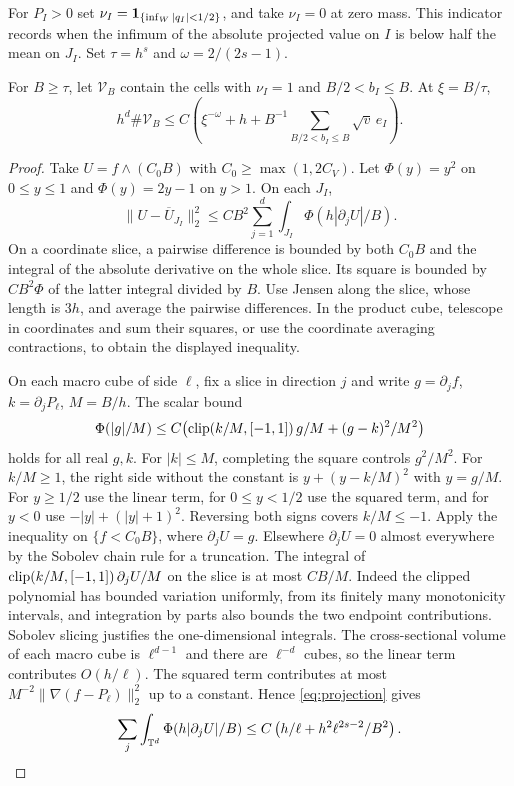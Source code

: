 For \(P_I>0\) set \(\nu_I=\mathbf 1_{\{\inf_W|q_I|<1/2\}}\),
and take \(\nu_I=0\) at zero mass.
This indicator records when the infimum of the absolute projected value
on \(I\) is below half the mean on \(J_I\).
Set \(\tau=h^s\) and \(\omega=2/(2s-1)\).
\begin{lemma}\label{lem:bands}
For \(B\ge\tau\), let \(\mathcal V_B\) contain the cells with
\(\nu_I=1\) and \(B/2<b_I\le B\). At \(\xi=B/\tau\),
\[
 h^d\#\mathcal V_B\le
 C\left(\xi^{-\omega}+h+
         B^{-1}\sum_{B/2<b_I\le B}\sqrt v\,e_I\right).
\]
\end{lemma}
\begin{proof}
Take \(U=f\wedge (C_0B)\) with \(C_0\ge \max(1,2C_V)\).
Let \(\Phi(y)=y^2\) on \(0\le y\le1\) and \(\Phi(y)=2y-1\)
on \(y>1\). On each \(J_I\),
\[
 \|U-\overline U_{J_I}\|_2^2
 \le C B^2\sum_{j=1}^d\int_{J_I}\Phi(h|\partial_j U|/B).
\]
On a coordinate slice, a pairwise difference is bounded by both
\(C_0 B\) and the integral of the absolute derivative on the whole
slice. Its square is bounded by \(CB^2\Phi\) of the latter integral
divided by \(B\). Use Jensen along the slice, whose length is \(3h\),
and average the pairwise differences. In the product cube, telescope
in coordinates and sum their squares, or use the coordinate
averaging contractions, to obtain the displayed inequality.

On each macro cube of side \(\ell\), fix a slice in direction \(j\)
and write \(g=\partial_j f\), \(k=\partial_j P_\ell\), \(M=B/h\).
The scalar bound
\[
 \Phi(|g|/M)\le
 C\bigl(\operatorname{clip}(k/M,[-1,1])\,g/M+(g-k)^2/M^2\bigr)
\]
holds for all real \(g,k\). For \(|k|\le M\), completing the
square controls \(g^2/M^2\). For \(k/M\ge1\), the right side
without the constant is \(y+(y-k/M)^2\) with \(y=g/M\).
For \(y\ge1/2\) use the linear term, for \(0\le y<1/2\)
use the squared term, and for \(y<0\) use
\(-|y|+(|y|+1)^2\). Reversing both signs covers \(k/M\le-1\).
Apply the inequality on \(\{f<C_0 B\}\), where
\(\partial_j U=g\). Elsewhere \(\partial_j U=0\) almost
everywhere by the Sobolev chain rule for a truncation.
The integral of \(\operatorname{clip}(k/M,[-1,1])\,\partial_j U/M\) on the
slice is at most \(C B/M\). Indeed the clipped polynomial
has bounded variation uniformly, from its finitely many
monotonicity intervals, and integration by parts also bounds the
two endpoint contributions. Sobolev slicing justifies the
one-dimensional integrals. The cross-sectional volume of each
macro cube is \(\ell^{d-1}\) and there are \(\ell^{-d}\) cubes,
so the linear term contributes \(O(h/\ell)\). The squared
term contributes at most \(M^{-2}\|\nabla(f-P_\ell)\|_2^2\)
up to a constant. Hence \eqref{eq:projection} gives
\begin{equation}\label{eq:huber}
 \sum_j\int_{\mathbb T^d}\Phi(h|\partial_j U|/B)
 \le C\left(h/\ell+h^2\ell^{2s-2}/B^2\right).
\end{equation}


\end{proof}
